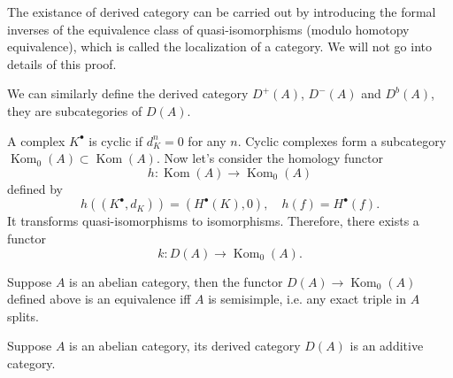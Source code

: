 The existance of derived category can be carried out by introducing 
the formal inverses of the equivalence class of quasi-isomorphisms 
(modulo homotopy equivalence), which is called the 
localization of a category. We will not go into details of this proof.

We can similarly define the derived category $D^+(A)$, $D^-(A)$ and 
$D^b(A)$, they are subcategories of $D(A)$.

\begin{para}
	A complex $K^\bullet$ is cyclic if $d_K^n=0$ for any $n$. 
	Cyclic complexes form a subcategory $\operatorname{Kom}_0(A)
	\subset \operatorname{Kom}(A)$. Now let's consider the 
	homology functor
	\[
		h:\operatorname{Kom}(A)\to \operatorname{Kom}_0(A)
	\]
	defined by 
	\[
		h((K^\bullet,d_K))=(H^\bullet(K),0),\quad 
		h(f)=H^\bullet(f).
	\]
	It transforms quasi-isomorphisms to isomorphisms. Therefore,
	there exists a functor 
	\[
		k:D(A)\to \operatorname{Kom}_0(A).
	\]
\end{para}

\begin{pro}
	Suppose $A$ is an abelian category, then 
	the functor $D(A)\to \operatorname{Kom}_0(A)$ defined above is 
	an equivalence iff $A$ is semisimple, i.e. any exact triple 
	in $A$ splits.
\end{pro}

\begin{thm}
	Suppose $A$ is an abelian category, its derived category $D(A)$
	is an additive category.
\end{thm}